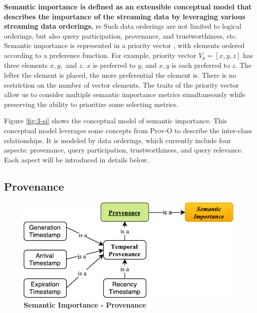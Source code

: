 \textbf{Semantic importance is defined as an extensible conceptual model that describes the importance of the streaming data by leveraging various streaming data orderings.}
re
Such data orderings are not limited to logical orderings, but also query participation, provenance, and trustworthiness, etc. 
Semantic importance is represented in a priority vector \cite{saaty2003decision}, with elements ordered according to a preference function.
For example, priority vector $V_{p} = [x, y, z]$ has three elements $x, y,$ and $z$.
$x$ is preferred to $y$, and $x, y$ is each preferred to $z$.
The lefter the element is placed, the more preferential the element is.  
There is no restriction on the number of vector elements. 
The traits of the priority vector allow us to consider multiple semantic importance metrics simultaneously while preserving the ability to prioritize some selecting metrics. 

Figure \ref{fig:3-si} shows the conceptual model of semantic importance. 
This conceptual model leverages some concepts from Prov-O \cite{lebo2013prov} to describe the inter-class relationships. 
It is modeled by data orderings, which currently include four aspects: provenance, query participation, trustworthiness, and query relevance.
Each aspect will be introduced in details below.
%
\subsection{Provenance}

\begin{figure}[!htbp]
	\centering
    \includegraphics[width=5in]{img/3-sip.pdf}
    \caption{\textbf{Semantic Importance - Provenance}}
    \label{fig:3-sip}
\end{figure}

